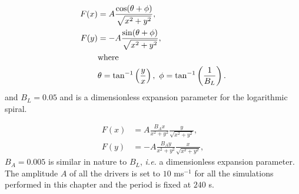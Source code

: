 \begin{subequations}
	\begin{align}
		F(x) &= A \frac{\cos(\theta + \phi)}{\sqrt{x^2 + y^2}},\\
		F(y) &= - A \frac{\sin(\theta + \phi)}{\sqrt{x^2 + y^2}},\\
			&\text{where}\notag\\
			&\theta = \tan^{-1}\left(\frac{y}{x}\right),\ \phi = \tan^{-1}\left(\frac{1}{B_L}\right).\notag	
	\end{align}
	\label{eq:Slog}
\end{subequations}
and $B_L = 0.05$ and is a dimensionless expansion parameter for the logarithmic spiral.
 
\begin{subequations}
	\begin{align}
		F(x) &= A \frac{B_Ax}{x^2 + y^2} \frac{y}{\sqrt{x^2 + y^2}},\\
		F(y) &= - A \frac{B_Ay}{x^2 + y^2} \frac{x}{\sqrt{x^2 + y^2}},
	\end{align}
	\label{eq:Sarch}
\end{subequations}
$B_A = 0.005$ is similar in nature to $B_L$, \textit{i.e.} a dimensionless expansion parameter.
The amplitude $A$ of all the drivers is set to $10$ ms$^{-1}$ for all the simulations performed in this chapter and the period is fixed at $240$ s.


